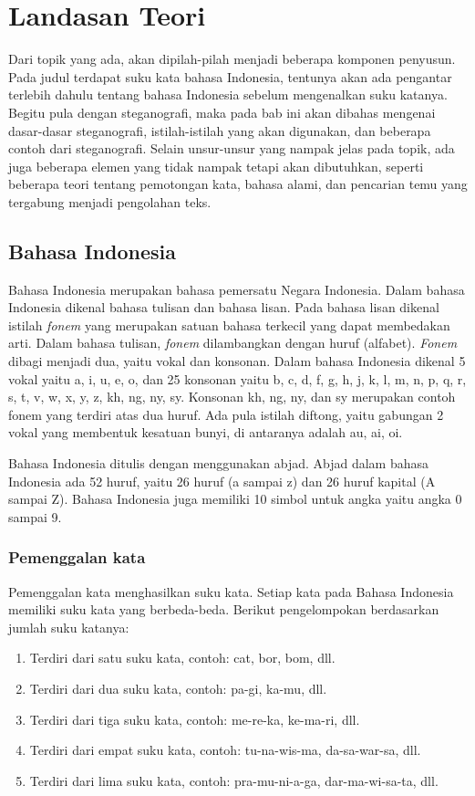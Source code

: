 \chapter{Landasan Teori}
\label{chap:landasan_teori}

Dari topik yang ada, akan dipilah-pilah menjadi beberapa komponen penyusun. Pada judul terdapat suku kata bahasa Indonesia, tentunya akan ada pengantar terlebih dahulu tentang bahasa Indonesia sebelum mengenalkan suku katanya. Begitu pula dengan steganografi, maka pada bab ini akan dibahas mengenai dasar-dasar steganografi, istilah-istilah yang akan digunakan, dan beberapa contoh dari steganografi. Selain unsur-unsur yang nampak jelas pada topik, ada juga beberapa elemen yang tidak nampak tetapi akan dibutuhkan, seperti beberapa teori tentang pemotongan kata, bahasa alami, dan pencarian temu yang tergabung menjadi pengolahan teks.

\section{Bahasa Indonesia \cite{eyd:2009}}
Bahasa Indonesia merupakan bahasa pemersatu Negara Indonesia. Dalam bahasa Indonesia dikenal bahasa tulisan dan bahasa lisan. Pada bahasa lisan dikenal istilah \textit{fonem} yang merupakan satuan bahasa terkecil yang dapat membedakan arti. Dalam bahasa tulisan, \textit{fonem} dilambangkan dengan huruf (alfabet). \textit{Fonem} dibagi menjadi dua, yaitu vokal dan konsonan. Dalam bahasa Indonesia dikenal 5 vokal yaitu a, i, u, e, o, dan 25 konsonan yaitu b, c, d, f, g, h, j, k, l, m, n, p, q, r, s, t, v, w, x, y, z, kh, ng, ny, sy. Konsonan kh, ng, ny, dan sy merupakan contoh fonem yang terdiri atas dua huruf. Ada pula istilah diftong, yaitu gabungan 2 vokal yang membentuk kesatuan bunyi, di antaranya adalah au, ai, oi.

Bahasa Indonesia ditulis dengan menggunakan abjad. Abjad dalam bahasa Indonesia ada 52 huruf, yaitu 26 huruf (a sampai z) dan 26 huruf kapital (A sampai Z). Bahasa Indonesia juga memiliki 10 simbol untuk angka yaitu angka 0 sampai 9.

\subsection{Pemenggalan kata}
Pemenggalan kata menghasilkan suku kata. Setiap kata pada Bahasa Indonesia memiliki suku kata yang berbeda-beda. 
Berikut pengelompokan berdasarkan jumlah suku katanya:

\begin{enumerate}
	\item Terdiri dari satu suku kata, contoh: cat, bor, bom, dll.
	\item Terdiri dari dua suku kata, contoh: pa-gi, ka-mu, dll.
	\item Terdiri dari tiga suku kata, contoh: me-re-ka, ke-ma-ri, dll.
	\item Terdiri dari empat suku kata, contoh: tu-na-wis-ma, da-sa-war-sa, dll.
	\item Terdiri dari lima suku kata, contoh: pra-mu-ni-a-ga, dar-ma-wi-sa-ta, dll.
\end{enumerate}

